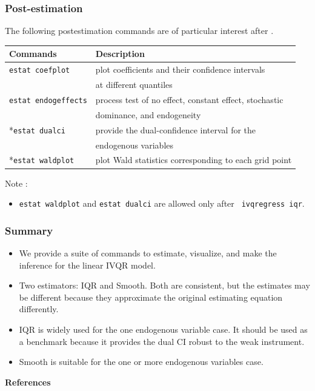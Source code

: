 \documentclass[11pt]{beamer}
\begin{document}
\begin{frame}
  \frametitle{Post-estimation}
The following postestimation commands are of particular interest after {\ivqreg}.

\vskip 0.5cm
{\footnotesize
\begin{tabular}{ll}
\hline
Commands & Description \\
\hline
{\tt estat coefplot} & plot coefficients and their confidence intervals \\
	& at different quantiles\\
{\tt estat endogeffects} & process test of no effect, constant effect,
stochastic \\
	& dominance, and endogeneity \\
*{\tt estat dualci} & provide the dual-confidence interval for 	
	the \\ &  endogenous variables \\
*{\tt estat waldplot} & plot Wald statistics corresponding to each grid point
\\
\hline
\end{tabular}

\vskip 0.5cm
Note :
\begin{itemize}
  \item {\tt estat waldplot} and {\tt estat dualci} are allowed only after {\tt
    ivqregress iqr}.
\end{itemize}
}

\end{frame}

\begin{frame}
  \frametitle{Summary}
  \begin{itemize}
    \setlength\itemsep{1em}

    \item We provide a suite of commands to estimate, visualize, and make the
      inference for the linear IVQR model.

    \item Two estimators: IQR and Smooth. Both are consistent, but the estimates
      may be different because they approximate the original estimating equation
      differently.

    \item IQR is widely used for the one endogenous variable case. It should be
      used as a benchmark because it provides the dual CI robust to the weak
      instrument.

    \item Smooth is suitable for the one or more endogenous variables case.

  \end{itemize}
\end{frame}


\clearpage
{\bf References}



{
\beamertemplatenavigationsymbolsempty
{}

}
\end{document}
